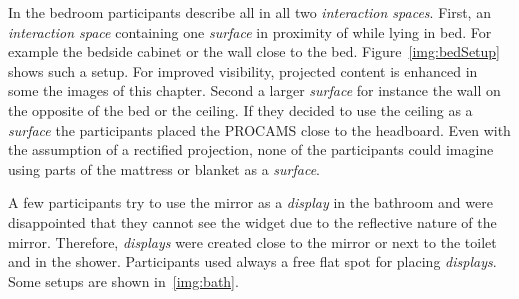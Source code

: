 In the bedroom participants describe all in all two \emph{interaction spaces}. First, an \emph{interaction space} containing one \emph{surface} in proximity of while lying in bed. For example the bedside cabinet or the wall close to the bed. Figure~\ref{img:bedSetup} shows such a setup. For improved visibility, projected content is enhanced in some the images of this chapter. Second a larger \emph{surface} for instance the wall on the opposite of the bed or the ceiling. If they decided to use the ceiling as a \emph{surface} the participants placed the \ac{PROCAMS} close to the headboard. Even with the assumption of a rectified projection, none of the participants could imagine using parts of the mattress or blanket as a \emph{surface}.

A few participants try to use the mirror as a \emph{display} in the bathroom and were disappointed that they cannot see the widget due to the reflective nature of the mirror. Therefore, \emph{displays} were created close to the mirror or next to the toilet and in the shower. Participants used always a free flat spot for placing \emph{displays}. Some setups are shown in~\autoref{img:bath}.

